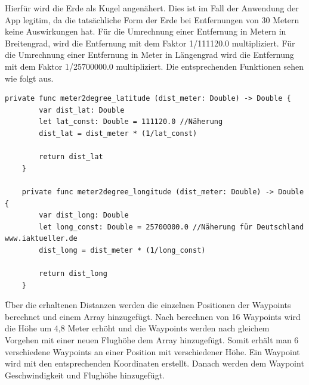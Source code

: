 \newline
Hierfür wird die Erde als Kugel angenähert. Dies ist im Fall der Anwendung der App legitim, da die tatsächliche Form der Erde bei Entfernungen von 30 Metern keine Auswirkungen hat. Für die Umrechnung einer Entfernung in Metern in Breitengrad, wird die Entfernung mit dem Faktor 1/111120.0 multipliziert. Für die Umrechnung einer Entfernung in Meter in Längengrad wird die Entfernung mit dem Faktor 1/25700000.0 multipliziert. Die entsprechenden Funktionen sehen wie folgt aus.
\newline
\begin{lstlisting}[caption={Umrechnung Meter in Längengrad und Breitengrad}]
	private func meter2degree_latitude (dist_meter: Double) -> Double {
		var dist_lat: Double
		let lat_const: Double = 111120.0 //Näherung
		dist_lat = dist_meter * (1/lat_const)
	
		return dist_lat
	}
	
	private func meter2degree_longitude (dist_meter: Double) -> Double {
		var dist_long: Double
		let long_const: Double = 25700000.0 //Näherung für Deutschland www.iaktueller.de
		dist_long = dist_meter * (1/long_const)
	
		return dist_long
	}
\end{lstlisting}
Über die erhaltenen Distanzen werden die einzelnen Positionen der Waypoints berechnet und einem Array hinzugefügt. Nach berechnen von 16 Waypoints wird die Höhe um 4,8 Meter erhöht und die Waypoints werden nach gleichem Vorgehen mit einer neuen Flughöhe dem Array hinzugefügt. Somit erhält man 6 verschiedene Waypoints an einer Position mit verschiedener Höhe. 
\newline
Ein Waypoint wird mit den entsprechenden Koordinaten erstellt. Danach werden dem Waypoint Geschwindigkeit und Flughöhe hinzugefügt. 